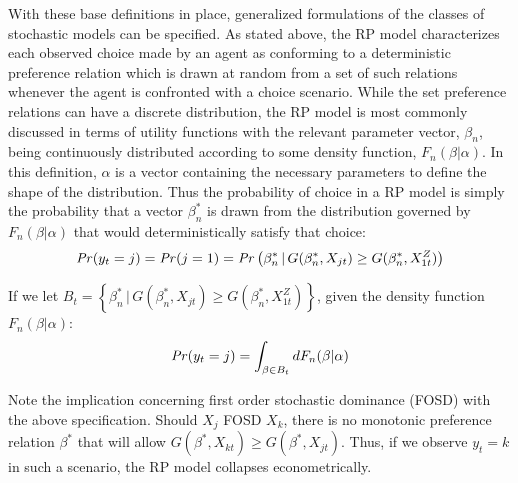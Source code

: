 With these base definitions in place, generalized formulations of the classes of stochastic models can be specified.
As stated above, the RP model characterizes each observed choice made by an agent as conforming to a deterministic preference relation which is drawn at random from a set of such relations whenever the agent is confronted with a choice scenario.
While the set preference relations can have a discrete distribution, the RP model is most commonly discussed in terms of utility functions with the relevant parameter vector, $\beta_n$, being continuously distributed according to some density function, $F_n(\beta | \alpha)$.
In this definition, $\alpha$ is a vector containing the necessary parameters to define the shape of the distribution.
Thus the probability of choice in a RP model is simply the probability that a vector $\beta_n^*$ is drawn from the distribution governed by $F_n(\beta | \alpha)$ that would deterministically satisfy that choice:
\begin{equation}
	\label{eq:RP0}
	{\ensuremath{\mathit{Pr}}}(y_t=j) = {\mathit{Pr}}(j=1) = {\mathit{Pr}}\left( \beta_n^* \,|\, G(\beta_n^*,X_{jt}) \geq G(\beta_n^*,X_{1t}^Z)\right)
\end{equation}

\noindent If we let $ B_t = \left\{ \beta_n^* \,|\, G(\beta_n^*,X_{jt}) \geq G(\beta_n^*,X_{1t}^Z)\right\}$, given the density function $F_n(\beta | \alpha)$:
\begin{equation}
	\label{eq:RP.f}
	{\ensuremath{\mathit{Pr}}}(y_t=j) = \int_{\beta \in B_t} dF_n(\beta|\alpha)
\end{equation}

Note the implication concerning first order stochastic dominance (FOSD){\footnotemark} with the above specification. Should $X_j$ FOSD $X_k$, there is no monotonic preference relation $\beta^*$ that will allow $G(\beta^*,X_{kt}) \geq G(\beta^*,X_{jt})$.
Thus, if we observe $y_t = k$ in such a scenario, the RP model collapses econometrically.

\addtocounter{footnote}{-1}

